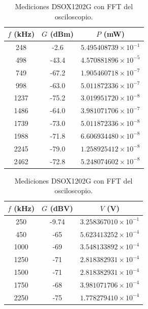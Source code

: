 \begin{table}[h!]
\centering

\begin{minipage}{0.47\textwidth}
\centering
\begin{tabular}{ccc}
\toprule
$f$ (kHz) & $G$ (dBm) & $P$ (mW) \\
\midrule
248  & -2.6  & $5.495408739\times10^{-1}$ \\
498  & -43.4 & $4.570881896\times10^{-5}$ \\
749  & -67.2 & $1.905460718\times10^{-7}$ \\
998  & -63.0 & $5.011872336\times10^{-7}$ \\
1237 & -75.2 & $3.019951720\times10^{-8}$ \\
1486 & -64.0 & $3.981071706\times10^{-7}$ \\
1739 & -73.0 & $5.011872336\times10^{-8}$ \\
1988 & -71.8 & $6.606934480\times10^{-8}$ \\
2245 & -79.0 & $1.258925412\times10^{-8}$ \\
2462 & -72.8 & $5.248074602\times10^{-8}$ \\
\bottomrule
\end{tabular}
\caption{Mediciones DSOX1202G con analizador de espectros.}
\end{minipage}
\hfill
\begin{minipage}{0.47\textwidth}
\centering
\begin{tabular}{ccc}
\toprule
$f$ (kHz) & $G$ (dBV) & $V$ (V) \\
\midrule
250  & -9.74 & $3.258367010\times10^{-1}$ \\
450  & -65   & $5.623413252\times10^{-4}$ \\
1000 & -69   & $3.548133892\times10^{-4}$ \\
1250 & -71   & $2.818382931\times10^{-4}$ \\
1500 & -71   & $2.818382931\times10^{-4}$ \\
1750 & -68   & $3.981071706\times10^{-4}$ \\
2250 & -75   & $1.778279410\times10^{-4}$ \\
\bottomrule
\end{tabular}
\caption{Mediciones DSOX1202G con FFT del osciloscopio.}
\end{minipage}

\end{table}



